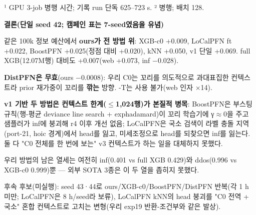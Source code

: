 ¹ GPU 3-job 병행 시간; 기록 run 단독 625–723 s. ² 병행; 배치 128.

\textbf{결론(단일 seed 42; 캠페인 표는 7-seed였음을 유념)}

\par\noindent \textbullet\enspace 같은 100k 정보 예산에서 \textbf{ours가 전 방법 위}: XGB-c0 +\allowbreak{}0.009, LoCalPFN ft +\allowbreak{}0.022, BoostPFN +\allowbreak{}0.025(정점 대비 +\allowbreak{}0.020), kNN +\allowbreak{}0.050, v1 단일 +\allowbreak{}0.069. full XGB(12.07M행) 대비도 +\allowbreak{}0.007(web +\allowbreak{}0.073, inf −0.028).


\par\noindent \textbullet\enspace \textbf{DistPFN은 무효}(ours −0.0008): 우리 C0는 꼬리를 의도적으로 과대표집한 컨텍스트라 prior 재가중이 꼬리를 \textbf{깎는} 방향. -T는 사용 불가(web 인자 ×14).


\par\noindent \textbullet\enspace \textbf{v1 기반 두 방법은 컨텍스트 한계(\ensuremath{\leq}1,024행)가 본질적 병목}: BoostPFN은 부스팅 규칙(행-평균 deviance line search +\allowbreak{} exphadamard)이 꼬리 학습기에 γ\ensuremath{\approx}0을 주고 샘플러가 inf에 붕괴해 r4 이후 개선 없음; LoCalPFN은 국소 검색이 라벨 충돌 지역(port-21, hoic 경계)에서 head를 잃고, 미세조정으로 head를 되찾으면 inf를 잃는다. 둘 다 "C0 전체를 한 번에 보는" v3 컨텍스트가 하는 일을 대체하지 못했다.


\par\noindent \textbullet\enspace 우리 방법의 남은 열세는 여전히 inf(0.401 vs full XGB 0.429)와 ddos(0.996 vs XGB-c0 0.999)뿐 — 외부 SOTA 3종은 이 두 열을 좁히지 못했다.


\par\noindent \textbullet\enspace 후속 후보(미실행): seed 43·44로 ours/\allowbreak{}XGB-c0/\allowbreak{}BoostPFN/\allowbreak{}DistPFN 반복(각 1 h 미만; LoCalPFN은 8 h/\allowbreak{}seed라 보류), LoCalPFN kNN의 head 붕괴를 "C0 전역 +\allowbreak{} 국소" 혼합 컨텍스트로 고치는 변형(우리 exp19 반환-조건부와 같은 발상).



